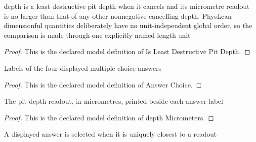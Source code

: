 \begin{definition}
  \label{def:physics:phyx-mini-0116:phyxminiproblems-problemphyxmini0116-isleastdestructivepitdepth}
  depth is a least destructive pit depth when it cancels and its micrometre readout is no larger than that of any other nonnegative cancelling depth. PhysLean dimensionful quantities deliberately have no unit-independent global order, so the comparison is made through one explicitly named length unit
\end{definition}
\begin{proof}
  This is the declared model definition of Is Least Destructive Pit Depth.
\end{proof}
\begin{definition}
  \label{def:physics:phyx-mini-0116:phyxminiproblems-problemphyxmini0116-answerchoice}
  Labels of the four displayed multiple-choice answers
\end{definition}
\begin{proof}
  This is the declared model definition of Answer Choice.
\end{proof}
\begin{definition}
  \label{def:physics:phyx-mini-0116:phyxminiproblems-problemphyxmini0116-answerchoice-depthmicrometers}
  The pit-depth readout, in micrometres, printed beside each answer label
\end{definition}
\begin{proof}
  This is the declared model definition of depth Micrometers.
\end{proof}
\begin{definition}
  \label{def:physics:phyx-mini-0116:phyxminiproblems-problemphyxmini0116-isuniquelyclosestanswer}
  A displayed answer is selected when it is uniquely closest to a readout
\end{definition}
